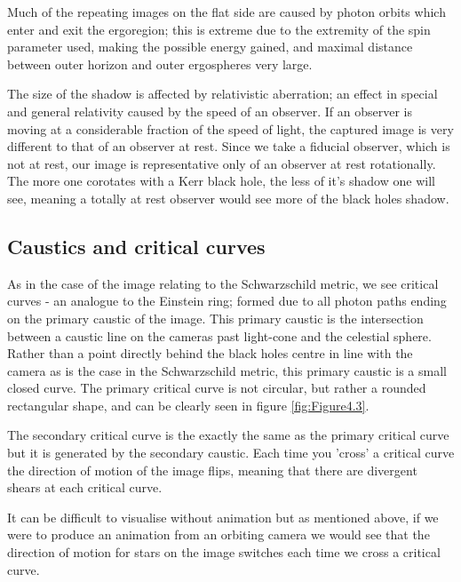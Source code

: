 \documentclass[oneside,openright,frontopenright, singlespacing]{dmathesis}
\begin{document}
\vspace{1em}
	Much of the repeating images on the flat side are caused by photon orbits which enter and exit the ergoregion; this is extreme due to the extremity of the spin parameter used, making the possible energy gained, and maximal distance between outer horizon and outer ergospheres very large.

\vspace{1em}
	The size of the shadow is affected by relativistic aberration; an effect in special and general relativity caused by the speed of an observer. If an observer is moving at a considerable fraction of the speed of light, the captured image is very different to that of an observer at rest. Since we take a fiducial observer, which is not at rest, our image is representative only of an observer at rest rotationally. The more one corotates with a Kerr black hole, the less of it's shadow one will see, meaning a totally at rest observer would see more of the black holes shadow.

\subsection{Caustics and critical curves}\label{subsec:SubSection4.8.2}

\vspace{1em}
	As in the case of the image relating to the Schwarzschild metric, we see critical curves - an analogue to the Einstein ring; formed due to all photon paths ending on the primary caustic of the image. This primary caustic is the intersection between a caustic line on the cameras past light-cone and the celestial sphere. Rather than a point directly behind the black holes centre in line with the camera as is the case in the Schwarzschild metric, this primary caustic is a small closed curve. The primary critical curve is not circular, but rather a rounded rectangular shape, and can be clearly seen in figure \ref{fig:Figure4.3}.

\vspace{1em}
	The secondary critical curve is the exactly the same as the primary critical curve but it is generated by the secondary caustic. Each time you 'cross' a critical curve the direction of motion of the image flips, meaning that there are divergent shears at each critical curve.

\vspace{1em}
	It can be difficult to visualise without animation but as mentioned above, if we were to produce an animation from an orbiting camera we would see that the direction of motion for stars on the image switches each time we cross a critical curve.
\end{document}
